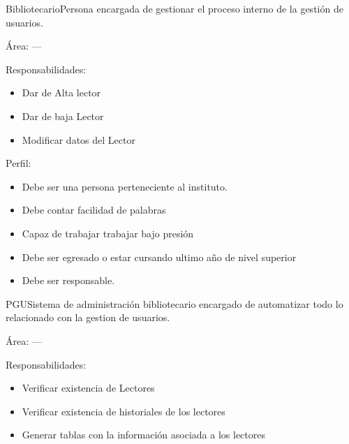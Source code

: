 \begin{Actor}{Bibliotecario}{Persona encargada de gestionar el proceso interno de la gestión de usuarios. }
	\item[Área:] ---
	\item[Responsabilidades:] \hspace{1pt}
	\begin{itemize}
		\item Dar de Alta lector
		\item Dar de baja Lector
		\item Modificar datos del Lector
			\end{itemize}
\item[Perfil:] \hspace{1pt}
	\begin{itemize}
	\item Debe ser una persona perteneciente al instituto.
		\item Debe contar facilidad de palabras
		\item Capaz de trabajar trabajar bajo presión 
		\item Debe ser egresado o estar cursando ultimo año de nivel superior 		
		\item Debe ser responsable.
	\end{itemize}
\end{Actor}




\begin{Actor}{PGU}{Sistema de administración bibliotecario encargado de automatizar todo lo relacionado con la gestion de usuarios.}
	\item[Área:] ---
	\item[Responsabilidades:] \hspace{1pt}
	\begin{itemize}
		\item Verificar existencia de Lectores
		\item Verificar existencia de historiales de los lectores
		\item Generar tablas con la información asociada a los lectores
			\end{itemize}
\end{Actor}



